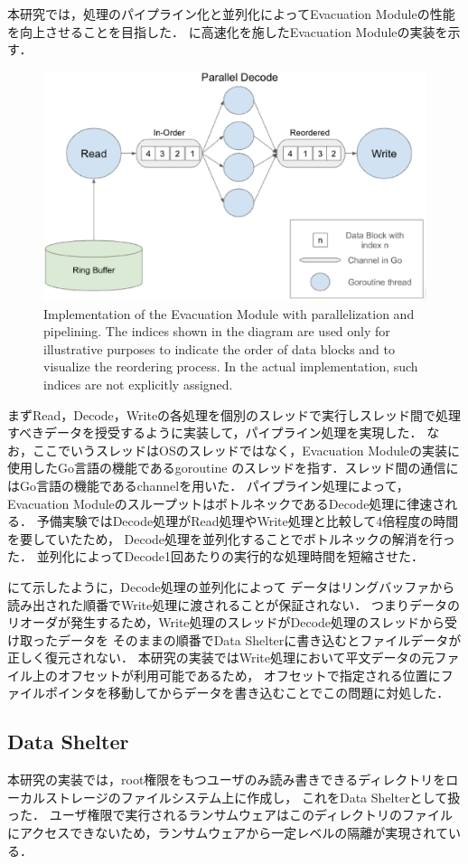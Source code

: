 本研究では，処理のパイプライン化と並列化によってEvacuation Moduleの性能を向上させることを目指した．
に高速化を施したEvacuation Moduleの実装を示す．
\begin{figure}[t]
  \begin{center}
    \includegraphics[width=\columnwidth]{doc/img/evac_mon_impl.eps}
  \end{center}
  \caption{Implementation of the Evacuation Module with parallelization and pipelining.
    The indices shown in the diagram are used only for illustrative purposes to indicate
    the order of data blocks and to visualize the reordering process. In the actual implementation,
    such indices are not explicitly assigned.
  }
  \label{fig:evac-mon-impl}
\end{figure}
まずRead，Decode，Writeの各処理を個別のスレッドで実行しスレッド間で処理すべきデータを授受するように実装して，パイプライン処理を実現した．
なお，ここでいうスレッドはOSのスレッドではなく，Evacuation Moduleの実装に使用したGo言語の機能であるgoroutine \cite{TheGoMem67:online}
のスレッドを指す．スレッド間の通信にはGo言語の機能であるchannelを用いた．
パイプライン処理によって，Evacuation ModuleのスループットはボトルネックであるDecode処理に律速される．
予備実験ではDecode処理がRead処理やWrite処理と比較して4倍程度の時間を要していたため，
Decode処理を並列化することでボトルネックの解消を行った．
並列化によってDecode1回あたりの実行的な処理時間を短縮させた．

にて示したように，Decode処理の並列化によって
データはリングバッファから読み出された順番でWrite処理に渡されることが保証されない．
つまりデータのリオーダが発生するため，Write処理のスレッドがDecode処理のスレッドから受け取ったデータを
そのままの順番でData Shelterに書き込むとファイルデータが正しく復元されない．
本研究の実装ではWrite処理において平文データの元ファイル上のオフセットが利用可能であるため，
オフセットで指定される位置にファイルポインタを移動してからデータを書き込むことでこの問題に対処した．

\subsection{Data Shelter}
本研究の実装では，root権限をもつユーザのみ読み書きできるディレクトリをローカルストレージのファイルシステム上に作成し，
これをData Shelterとして扱った．
ユーザ権限で実行されるランサムウェアはこのディレクトリのファイルにアクセスできないため，ランサムウェアから一定レベルの隔離が実現されている．
